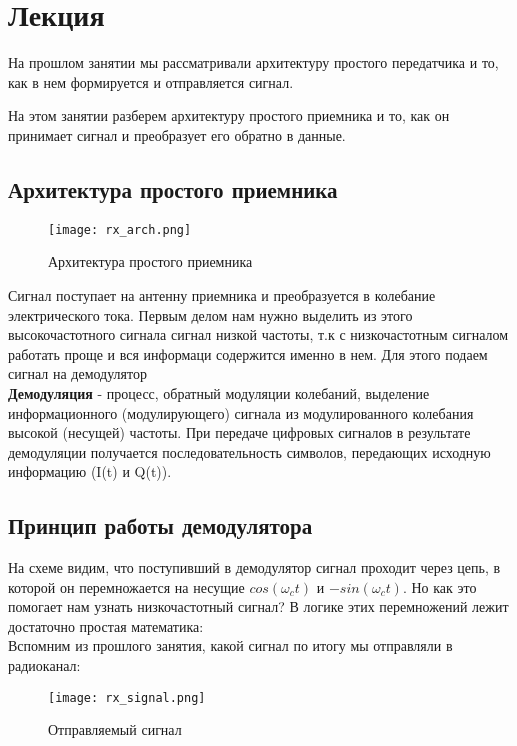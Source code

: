 \chapter{Лекция}
\label{ch:intro}

На прошлом занятии мы рассматривали архитектуру простого передатчика и то, как в нем формируется и отправляется сигнал.

На этом занятии разберем архитектуру простого приемника и то, как он принимает сигнал и преобразует его обратно в данные.

\section*{\textbf{Архитектура простого приемника}}

\begin{figure}[H]
    \centering
    \texttt{[image: rx\_arch.png]}
    \caption{Архитектура простого приемника}
\end{figure}

Сигнал поступает на антенну приемника и преобразуется в колебание электрического тока. Первым делом нам нужно выделить из этого
высокочастотного сигнала сигнал низкой частоты, т.к с низкочастотным сигналом работать проще и вся информаци содержится именно в нем.
Для этого подаем сигнал на демодулятор \\

\textbf{Демодуляция} - процесс, обратный модуляции колебаний, выделение информационного (модулирующего) сигнала из 
модулированного колебания высокой (несущей) частоты.  При передаче цифровых сигналов в результате демодуляции получается 
последовательность символов, передающих исходную информацию (I(t) и Q(t)).

\section*{\textbf{Принцип работы демодулятора}}

На схеме видим, что поступивший в демодулятор сигнал проходит через цепь, в которой он перемножается на несущие $cos(\omega_ct)$ и
$-sin(\omega_ct)$. Но как это помогает нам узнать низкочастотный сигнал? В логике этих перемножений лежит достаточно простая
математика: \\

Вспомним из прошлого занятия, какой сигнал по итогу мы отправляли в радиоканал:

\begin{figure}[H]
    \centering
    \texttt{[image: rx\_signal.png]}
    \caption{Отправляемый сигнал}
\end{figure}

